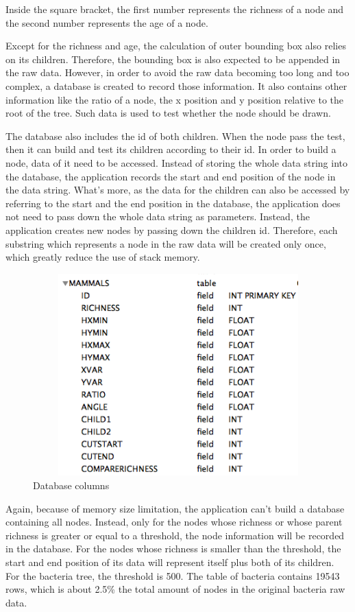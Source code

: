 \documentclass[MSc]{icldt}
\begin{document}
Inside the square bracket, the first number represents the richness of a node and the second number represents the age of a node.

Except for the richness and age, the calculation of outer bounding box also relies on its children. Therefore, the bounding box is also expected to be appended in the raw data. However, in order to avoid the raw data becoming too long and too complex, a database is created to record those information. It also contains other information like the ratio of a node, the x position and y position relative to the root of the tree. Such data is used to test whether the node should be drawn. 

The database also includes the id of both children. When the node pass the test, then it can build and test its children according to their id. In order to build a node, data of it need to be accessed. Instead of storing the whole data string into the database, the application records the start and end position of the node in the data string. What's more, as the data for the children can also be accessed by referring to the start and the end position in the database, the application does not need to pass down the whole data string as parameters. Instead, the application creates new nodes by passing down the children id. Therefore, each substring which represents a node in the raw data will be created only once, which greatly reduce the use of stack memory. 

\begin{figure}[H]
  \centering
  \includegraphics [width=15cm,height=7.8cm]{Database}
  \caption{Database columns}
  \label{fig:mammal}
\end{figure}

Again, because of memory size limitation, the application can't build a database containing all nodes. Instead, only for the nodes whose richness or whose parent richness is greater or equal to a threshold, the node information will be recorded in the database. For the nodes whose richness is smaller than the threshold, the start and end position of its data will represent itself plus both of its children. For the bacteria tree, the threshold is 500. The table of bacteria contains  19543 rows, which is about 2.5\% the total amount of nodes in the original bacteria raw data.
\end{document}
